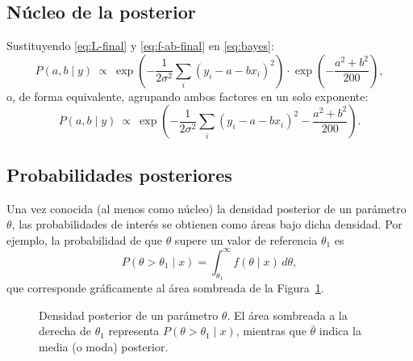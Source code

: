 \documentclass[11pt]{article}
\theoremstyle{remark}
\begin{document}
\subsection{Núcleo de la posterior}

Sustituyendo \eqref{eq:L-final} y \eqref{eq:f-ab-final} en \eqref{eq:bayes}:
\begin{equation}
P(a,b\mid y)\ \propto\
\exp\!\left(-\frac{1}{2\sigma^2}\sum_{i}(y_i-a-bx_i)^2\right)
\cdot
\exp\!\left(-\frac{a^2+b^2}{200}\right),
\label{eq:posterior1}
\end{equation}
o, de forma equivalente, agrupando ambos factores en un solo exponente:
\begin{equation}
P(a,b\mid y)\ \propto\
\exp\!\left(-\frac{1}{2\sigma^2}\sum_{i}(y_i-a-bx_i)^2 -\frac{a^2+b^2}{200}\right).
\label{eq:posterior2}
\end{equation}

\subsection{Probabilidades posteriores}

Una vez conocida (al menos como núcleo) la densidad posterior de un parámetro
$\theta$, las probabilidades de interés se obtienen como áreas bajo dicha
densidad. Por ejemplo, la probabilidad de que $\theta$ supere un valor de
referencia $\theta_1$ es
\begin{equation}
P(\theta>\theta_1\mid x) = \int_{\theta_1}^{\infty} f(\theta\mid x)\,d\theta,
\label{eq:prob-posterior}
\end{equation}
que corresponde gráficamente al área sombreada de la Figura~\ref{fig:posterior}.

\begin{figure}[h]
\centering
{}
\caption{Densidad posterior de un parámetro $\theta$. El área sombreada a la
derecha de $\theta_1$ representa $P(\theta>\theta_1\mid x)$, mientras que
$\bar\theta$ indica la media (o moda) posterior.}
\label{fig:posterior}
\end{figure}
\end{document}
